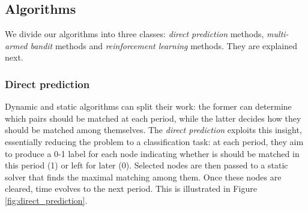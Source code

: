 \documentclass[12pt]{article}
\begin{document}
% 
% 
% 
% 


\subsection{Algorithms}

We divide our algorithms into three classes: \emph{direct prediction} methods, \emph{multi-armed bandit} methods and \emph{reinforcement learning} methods. They are explained next.

\subsubsection{Direct prediction} \label{subsubsec:estimation}

Dynamic and static algorithms can split their work: the former can determine which pairs should be matched at each period, while the latter decides how they should be matched among themselves. The \emph{direct prediction} exploits this insight, essentially reducing the problem to a classification task: at each period, they aim to produce a 0-1 label for each node indicating whether is should be matched in this period (1) or left for later (0). Selected nodes are then passed to a static solver that finds the maximal matching among them. Once these nodes are cleared, time evolves to the next period. This is illustrated in Figure \ref{fig:direct_prediction}.
\end{document}
